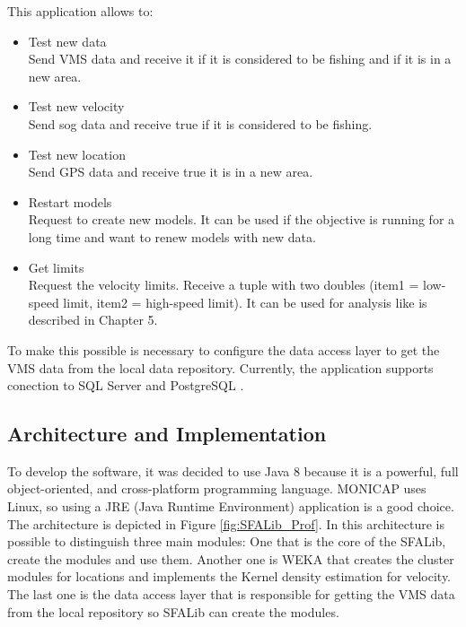 This application allows to:
\begin{itemize}
\item Test new data \\ Send VMS data and receive it if it is considered to be fishing and if it is in a new area.
\item Test new velocity \\ Send sog data and receive true if it is considered to be fishing.
\item Test new location \\ Send GPS data and receive true it is in a new area.
\item Restart models \\ Request to create new models. It can be used if the objective is running for a long time and want to renew models with new data. 
\item Get limits \\ Request the velocity limits. Receive a tuple with two doubles (item1 = low-speed limit, item2 = high-speed limit). It can be used for analysis like is described in Chapter 5.
\end{itemize}

To make this possible is necessary to configure the data access layer to get the VMS data from the local data repository.
Currently, the application supports conection to SQL Server \cite{WEBSITE:SqlServer} and PostgreSQL \cite{WEBSITE:Postgresql}.




\subsection{Architecture and Implementation} %
\label{sub:architecturee_implementation}
To develop the software, it was decided to use Java 8 \cite{WEBSITE:OraJava8} because it is a powerful, full object-oriented, and cross-platform programming language. MONICAP uses Linux, so using a JRE (Java Runtime Environment) application is a good choice.
The architecture is depicted in Figure \ref{fig:SFALib_Prof}. In this architecture is possible to distinguish three main modules: One that is the core of the SFALib, create the modules and use them. Another one is WEKA \cite{WEBSITE:Weka} that creates the cluster modules for locations and implements the Kernel density estimation  for velocity. The last one is the data access layer that is responsible for getting the VMS data from the local repository so SFALib can create the modules.


